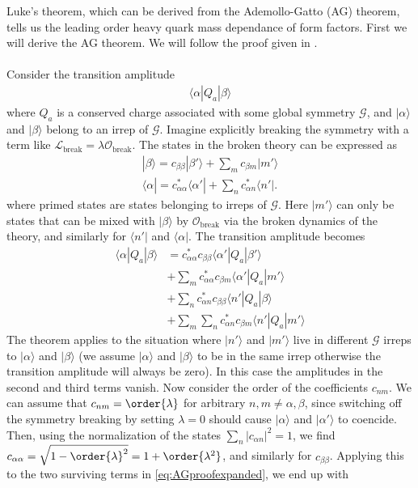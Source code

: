 Luke's theorem, which can be derived from the Ademollo-Gatto (AG) theorem, tells us the leading order heavy quark mass dependance of form factors. First we will derive the AG theorem. We will follow the proof given in \cite{Lebed:1991sq}.
\\ \\
Consider the transition amplitude
\begin{align}
	\langle \alpha | Q_a | \beta \rangle
\end{align}
where $Q_a$ is a conserved charge associated with some global symmetry $\mathcal{G}$, and $|\alpha\rangle$ and $|\beta\rangle$ belong to an irrep of $\mathcal{G}$. Imagine explicitly breaking the symmetry with a term like $\mathscr{L}_{\text{break}} = \lambda \mathcal{O}_{\text{break}}$. The states in the broken theory can be expressed as
\begin{align}
	|\beta \rangle = c_{\beta\beta} | \beta' \rangle + \sum_{m} c_{\beta m} | m' \rangle \\
	\langle \alpha | = c^*_{\alpha\alpha} \langle \alpha' | + \sum_{n} c^*_{\alpha n} \langle n' |.
\end{align}
where primed states are states belonging to irreps of $\mathcal{G}$. Here $|m'\rangle$ can only be states that can be mixed with $| \beta \rangle$ by $\mathcal{O}_{\text{break}}$ via the broken dynamics of the theory, and similarly for $\langle n' |$ and $\langle \alpha |$. The transition amplitude becomes
\begin{align}
\nonumber
	\langle \alpha | Q_a | \beta \rangle
	 	&= c_{\alpha\alpha}^* c_{\beta\beta} \langle \alpha' | Q_a | \beta' \rangle \\ 
	 	\nonumber
	 	&+ \sum_m c_{\alpha\alpha}^* c_{\beta m} \langle \alpha' | Q_a | m' \rangle \\
	 	\nonumber 
	 	&+ \sum_n c_{\alpha n}^* c_{\beta \beta} \langle n' | Q_a | \beta \rangle \\ 
	 	&+ \sum_m\sum_n c_{\alpha n}^* c_{\beta m} \langle n' | Q_a | m' \rangle
	 	\label{eq:AGproofexpanded}
\end{align}
The theorem applies to the situation where $|n'\rangle$ and $|m'\rangle$ live in different $\mathcal{G}$ irreps to $|\alpha\rangle$ and $|\beta \rangle$ (we assume $|\alpha\rangle$ and $|\beta \rangle$ to be in the same irrep otherwise the transition amplitude will always be zero). In this case the amplitudes in the second and third terms vanish. Now consider the order of the coefficients $c_{nm}$. We can assume that $c_{nm} = \order{\lambda}$ for arbitrary $n,m \neq \alpha,\beta$, since switching off the symmetry breaking by setting $\lambda=0$ should cause $|\alpha\rangle $ and $|\alpha'\rangle$ to coencide. Then, using the normalization of the states $\sum_{n} |c_{\alpha n} |^2 = 1$, we find $c_{\alpha\alpha} = \sqrt{1 - \order{\lambda}^2} = 1 + \order{\lambda^2}$, and similarly for $c_{\beta\beta}$. Applying this to the two surviving terms in \eqref{eq:AGproofexpanded}, we end up with
